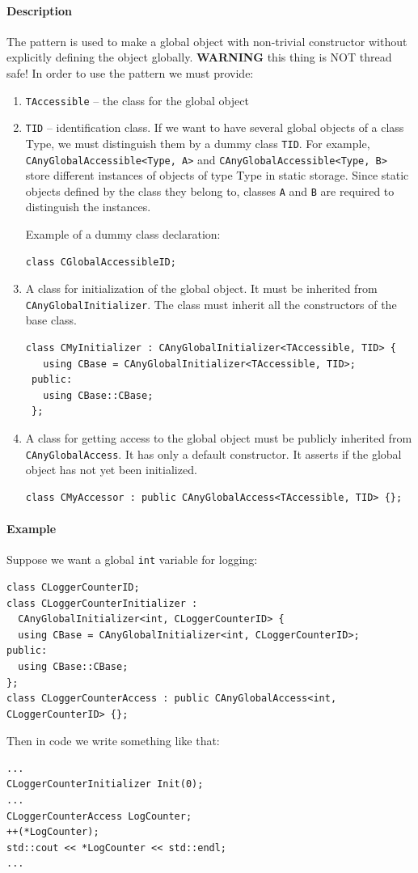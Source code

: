 \documentclass{article}
\begin{document}
\paragraph{Description}
The pattern is used to make a global object with non-trivial constructor without explicitly defining the object globally. \textbf{WARNING} this thing is NOT thread safe! In order to use the pattern we must provide:
\begin{enumerate}
\item \verb"TAccessible" -- the class for the global object

\item \verb"TID" -- identification class. If we want to have several global objects  of a class Type, we must distinguish them by a dummy class \verb"TID". For example, \verb"CAnyGlobalAccessible<Type, A>" and \verb"CAnyGlobalAccessible<Type, B>" store  different instances of objects of type Type in static storage. Since static objects defined by the class they belong to, classes \verb"A" and \verb"B" are required to distinguish the instances.

Example of a dummy class declaration:
\begin{verbatim}
class CGlobalAccessibleID;
\end{verbatim}

\item A class for initialization of the global object. It must be
 inherited from \verb"CAnyGlobalInitializer". The class must inherit all the constructors of the base class.
\begin{verbatim}
class CMyInitializer : CAnyGlobalInitializer<TAccessible, TID> {
   using CBase = CAnyGlobalInitializer<TAccessible, TID>;
 public:
   using CBase::CBase;
 };
\end{verbatim}

\item A class for getting access to the global object must be publicly inherited from \verb"CAnyGlobalAccess". It has only a default constructor. It asserts if  the global object has not yet been initialized.
\begin{verbatim}
class CMyAccessor : public CAnyGlobalAccess<TAccessible, TID> {};
 \end{verbatim}
\end{enumerate}

\paragraph{Example}
Suppose we want a global \verb"int" variable for logging:
\begin{verbatim}
class CLoggerCounterID;
class CLoggerCounterInitializer :
  CAnyGlobalInitializer<int, CLoggerCounterID> {
  using CBase = CAnyGlobalInitializer<int, CLoggerCounterID>;
public:
  using CBase::CBase;
};
class CLoggerCounterAccess : public CAnyGlobalAccess<int, CLoggerCounterID> {};
\end{verbatim}
Then in code we write something like that:
\begin{verbatim}
...
CLoggerCounterInitializer Init(0);
...
CLoggerCounterAccess LogCounter;
++(*LogCounter);
std::cout << *LogCounter << std::endl;
...
\end{verbatim}
\end{document}

